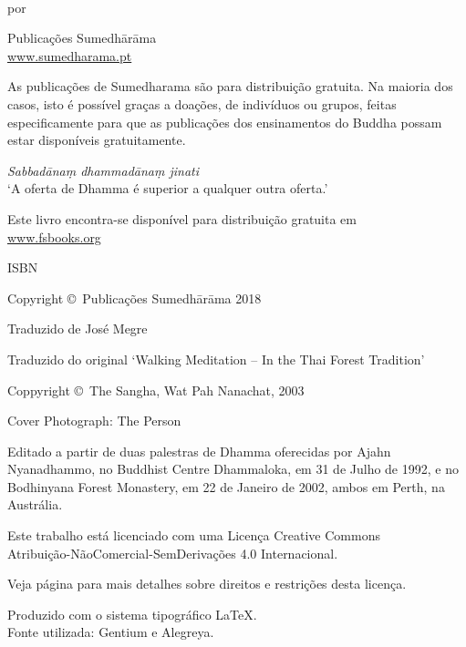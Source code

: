 \cleartoverso
\thispagestyle{empty}

{\copyrightsize
\centering
\setlength{\parindent}{0pt}%
\setlength{\parskip}{0.8\baselineskip}%

\thetitle\\
por \theauthor

Publicações Sumedhārāma\\
\href{http://sumedharama.pt}{www.sumedharama.pt}

As publicações de Sumedharama são para distribuição gratuita. Na maioria
dos casos, isto é possível graças a doações, de indivíduos ou grupos,
feitas especificamente para que as publicações dos ensinamentos do
Buddha possam estar disponíveis gratuitamente.

\textit{Sabbadānaṃ dhammadānaṃ jinati}\\
‘A oferta de Dhamma é superior a qualquer outra oferta.’

Este livro encontra-se disponível para distribuição gratuita em\\
\href{http://fsbooks.org/}{www.fsbooks.org}

ISBN \theISBN

Copyright \copyright\ Publicações Sumedhārāma 2018

Traduzido de José Megre

Traduzido do original `Walking Meditation -- In the Thai Forest Tradition'

Coppyright \copyright\ The Sangha, Wat Pah Nanachat, 2003

Cover Photograph: The Person

Editado a partir de duas palestras de Dhamma oferecidas por
Ajahn Nyanadhammo, no Buddhist Centre Dhammaloka, em 31 de Julho de
1992, e no Bodhinyana Forest Monastery, em 22 de Janeiro de 2002, ambos
em Perth, na Austrália.

\vfill

{\footnotesize

Este trabalho está licenciado com uma Licença Creative Commons\\
Atribuição-NãoComercial-SemDerivações 4.0 Internacional.

Veja página \pageref{copyright-details} para mais detalhes sobre direitos e restrições desta licença.

Produzido com o sistema tipográfico \LaTeX.\\
Fonte utilizada: Gentium e Alegreya.

\theEditionInfo

}}
